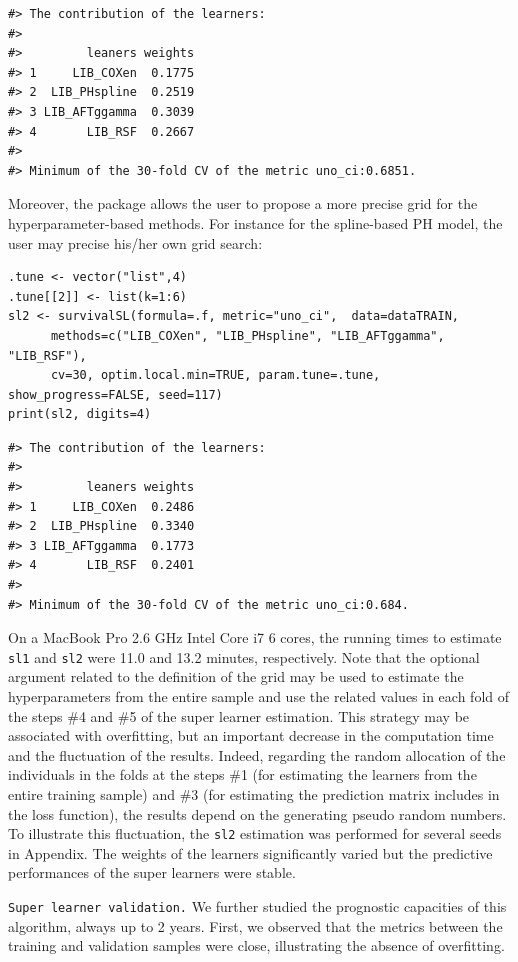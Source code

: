 \begin{verbatim}
#> The contribution of the learners: 
#> 
#>         leaners weights
#> 1     LIB_COXen  0.1775
#> 2  LIB_PHspline  0.2519
#> 3 LIB_AFTggamma  0.3039
#> 4       LIB_RSF  0.2667
#> 
#> Minimum of the 30-fold CV of the metric uno_ci:0.6851.
\end{verbatim}

Moreover, the package allows the user to propose a more precise grid for the hyperparameter-based methods. For instance for the spline-based PH model, the user may precise his/her own grid search:

\begin{verbatim}
.tune <- vector("list",4)
.tune[[2]] <- list(k=1:6)
sl2 <- survivalSL(formula=.f, metric="uno_ci",  data=dataTRAIN,
      methods=c("LIB_COXen", "LIB_PHspline", "LIB_AFTggamma", "LIB_RSF"),
      cv=30, optim.local.min=TRUE, param.tune=.tune, show_progress=FALSE, seed=117)
print(sl2, digits=4)
\end{verbatim}

\begin{verbatim}
#> The contribution of the learners: 
#> 
#>         leaners weights
#> 1     LIB_COXen  0.2486
#> 2  LIB_PHspline  0.3340
#> 3 LIB_AFTggamma  0.1773
#> 4       LIB_RSF  0.2401
#> 
#> Minimum of the 30-fold CV of the metric uno_ci:0.684.
\end{verbatim}

On a MacBook Pro 2.6 GHz Intel Core i7 6 cores, the running times to estimate \texttt{sl1} and \texttt{sl2} were 11.0 and 13.2 minutes, respectively. Note that the optional argument related to the definition of the grid may be used to estimate the hyperparameters from the entire sample and use the related values in each fold of the steps \#4 and \#5 of the super learner estimation. This strategy may be associated with overfitting, but an important decrease in the computation time and the fluctuation of the results. Indeed, regarding the random allocation of the individuals in the folds at the steps \#1 (for estimating the learners from the entire training sample) and \#3 (for estimating the prediction matrix includes in the loss function), the results depend on the generating pseudo random numbers. To illustrate this fluctuation, the \texttt{sl2} estimation was performed for several seeds in Appendix. The weights of the learners significantly varied but the predictive performances of the super learners were stable.

\texttt{Super\ learner\ validation.} We further studied the prognostic capacities of this algorithm, always up to 2 years. First, we observed that the metrics between the training and validation samples were close, illustrating the absence of overfitting.

